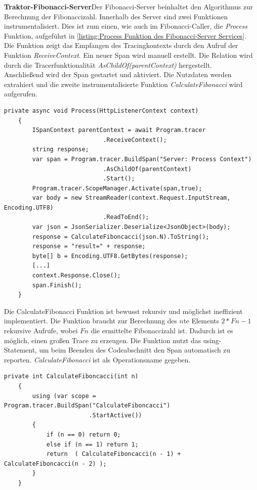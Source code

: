 \textbf{Traktor-Fibonacci-Server}\space\space\space Der Fibonacci-Server beinhaltet den Algorithmus zur Berechnung der Fibonaccizahl. 
Innerhalb des Server sind zwei Funktionen instrumentalisiert. Dies ist zum einen, wie auch im Fibonacci-Caller, die \emph{Process} Funktion, aufgeführt in \cref{listing:Process Funktion des Fibonacci-Server Services}. 
Die Funktion zeigt das Empfangen des Tracingkontexts durch den Aufruf der Funktion \emph{ReceiveContext}. Ein neuer Span wird manuell erstellt. 
Die Relation wird durch die Tracerfunktionalität \emph{AsChildOf(parentContext)} hergestellt. 
Anschließend wird der Span gestartet und aktiviert. 
Die Nutzdaten werden extrahiert und die zweite instrumentalisierte Funktion \emph{CalculateFibonacci} wird aufgerufen. 

\begin{minipage}[]{\textwidth}
	\begin{lstlisting}[frame=trBL]
	private async void Process(HttpListenerContext context)
	{
		ISpanContext parentContext = await Program.tracer
							.ReceiveContext();
		string response;
		var span = Program.tracer.BuildSpan("Server: Process Context")
							.AsChildOf(parentContext)
							.Start();
		Program.tracer.ScopeManager.Activate(span,true);
		var body = new StreamReader(context.Request.InputStream, Encoding.UTF8)
							.ReadToEnd();       
		var json = JsonSerializer.Deserialize<JsonObject>(body);
		response = CalculateFiboncacci(json.N).ToString();
		response = "result=" + response;
		byte[] b = Encoding.UTF8.GetBytes(response);
		[...]
		context.Response.Close();
		span.Finish();
	}
	\end{lstlisting}
	\label{listing:Process Funktion des Fibonacci-Server Services}
\end{minipage}

Die CalculateFibonacci Funktion ist bewusst rekursiv und möglichst ineffizient implementiert. Die Funktion braucht zur Berechnung des $n$te Elements $2 * Fn - 1$ rekursive Aufrufe, wobei $Fn$ die ermittelte Fibonaccizahl ist. Dadurch ist es möglich, einen großen Trace zu erzeugen. Die Funktion nutzt das using-Statement, um beim Beenden des Codeabschnitt den Span automatisch zu reporten. \emph{CalculateFibonacci} ist als Operationsname gegeben.

\begin{minipage}[]{\textwidth}
	\begin{lstlisting}[frame=trBL]
	private int CalculateFiboncacci(int n) 
	{
		using (var scope = Program.tracer.BuildSpan("CalculateFiboncacci")
						.StartActive())
		{
			if (n == 0) return 0;
			else if (n == 1) return 1;
			return  ( CalculateFiboncacci(n - 1) + CalculateFiboncacci(n - 2) );
		}
	}
	\end{lstlisting}
	\label{listing:Instrumentalisierte CalculateFibonacci Funktion des Fibonacci-Server Services}
\end{minipage}

